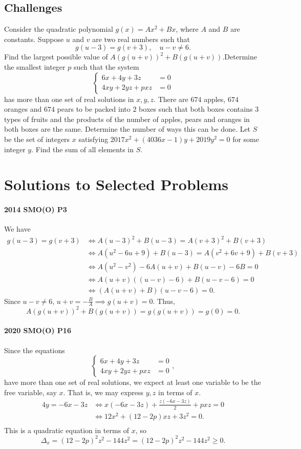 \documentclass[../jarvis.tex]{subfiles}
\begin{document}
\subsection{Challenges}
\problem[2014 SMO(O) P3]Consider the quadratic polynomial $g(x)=Ax^2+Bx$, where $A$ and $B$ are constants. Suppose $u$ and $v$ are two real numbers such that $$g(u-3)=g(v+3), \quad u-v\neq 6.$$
Find the largest possible value of $A(g(u+v))^2+B(g(u+v))$.\problem[2020 SMO(O) P16]Determine the smallest integer $p$ such that the system
$$\begin{cases}
    6x+4y+3z&=0 \\
    4xy+2yz+pxz&=0
\end{cases}$$
has more than one set of real solutions in $x,y,z$.
\problem[2017 SMO(O) P16]There are $674$ apples, $674$ oranges and $674$ pears to be packed into $2$ boxes such that both boxes contains $3$ types of fruits and the products of the number of apples, pears and oranges in both boxes are the same. Determine the number of ways this can be done.
\problem[2017 SMO(O) P17]Let $S$ be the set of integers $x$ satisfying $2017x^2+(4036x-1)y+2019y^2=0$ for some integer $y$. Find the sum of all elements in $S$.


\section{Solutions to Selected Problems}
\paragraph{2014 SMO(O) P3}
We have
\begin{align*}
    g(u-3)=g(v+3) &\iff A(u-3)^2+B(u-3)=A(v+3)^2+B(v+3) \\
    &\iff A(u^2-6u+9)+B(u-3)=A(v^2+6v+9)+B(v+3)\\
    &\iff A(u^2-v^2)-6A(u+v)+B(u-v)-6B=0 \\
    &\iff A(u+v)((u-v)-6)+B(u-v-6)=0 \\
    &\iff (A(u+v)+B)(u-v-6)=0.
\end{align*}
Since $u-v\neq 6$, $u+v=-\frac{B}{A} \implies g(u+v)=0$. Thus,
$$A(g(u+v))^2+B(g(u+v))=g(g(u+v))=g(0)=\boxed{0}.$$
\paragraph{2020 SMO(O) P16}Since the equations
$$\begin{cases}
    6x+4y+3z&=0 \\
    4xy+2yz+pxz&=0
\end{cases},$$
have more than one set of real solutions, we expect at least one variable to be the free variable, say $x$. That is, we may express $y,z$ in terms of $x$.
\begin{align*}
    4y=-6x-3z &\iff x(-6x-3z)+\frac{z(-6x-3z)}{2}+pxz=0 \\ &\iff 12x^2+(12-2p)xz+3z^2=0. \\
\end{align*}
This is a quadratic equation in terms of $x$, so
$$\Delta_{x}=(12-2p)^2z^2-144z^2=(12-2p)^2z^2-144z^2\geq 0.$$
\end{document}
